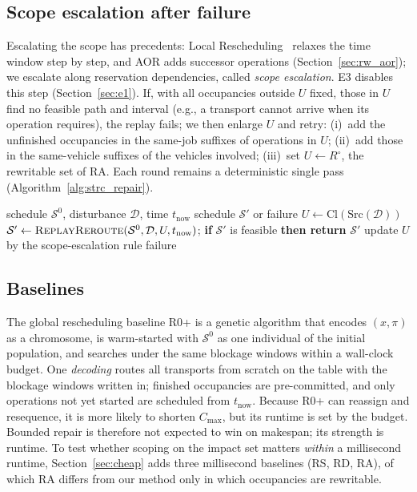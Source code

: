 \documentclass[manuscript,screen,review]{acmart}
\begin{document}
\subsection{Scope escalation after failure}
\label{sec:scope_escalation}

Escalating the scope has precedents: Local Rescheduling~\cite{kuster2007local} relaxes the time window step by step, and AOR adds successor operations (Section~\ref{sec:rw_aor}); we escalate along reservation dependencies, called \emph{scope escalation}. E3 disables this step (Section~\ref{sec:e1}).
If, with all occupancies outside \(U\) fixed, those in \(U\) find no feasible path and interval (e.g., a transport cannot arrive when its operation requires), the replay fails; we then enlarge \(U\) and retry:
(i)~add the unfinished occupancies in the same-job suffixes of operations in \(U\); (ii)~add those in the same-vehicle suffixes of the vehicles involved; (iii)~set \(U\leftarrow R^{\circ}\), the rewritable set of RA.
Each round remains a deterministic single pass (Algorithm~\ref{alg:strc_repair}).

\begin{algorithm}[t]
\caption{Bounded repair on the reservation impact set (single-pass rerouting + scope escalation)}
\label{alg:strc_repair}
\begin{algorithmic}[1]
\Require schedule \(\mathcal{S}^0\), disturbance \(\mathcal{D}\), time \(t_{\mathrm{now}}\)
\Ensure schedule \(\mathcal{S}'\) or failure
\State \(U \gets \mathrm{Cl}(\mathrm{Src}(\mathcal{D}))\)
  \State \(\mathcal{S}' \gets \textsc{ReplayReroute}(\mathcal{S}^0,\mathcal{D},U,t_{\mathrm{now}})\); \textbf{if} \(\mathcal{S}'\) is feasible \textbf{then return} \(\mathcal{S}'\)
  \State update \(U\) by the scope-escalation rule 
\EndFor
\State \Return failure
\end{algorithmic}
\end{algorithm}

\subsection{Baselines}
\label{sec:vs_r0}

The global rescheduling baseline R0+ is a genetic algorithm that encodes \((x,\pi)\) as a chromosome, is warm-started with \(\mathcal{S}^0\) as one individual of the initial population, and searches under the same blockage windows within a wall-clock budget.
One \emph{decoding} routes all transports from scratch on the table with the blockage windows written in; finished occupancies are pre-committed, and only operations not yet started are scheduled from \(t_{\mathrm{now}}\).
Because R0+ can reassign and resequence, it is more likely to shorten \(C_{\max}\), but its runtime is set by the budget.
Bounded repair is therefore not expected to win on makespan; its strength is runtime. To test whether scoping on the impact set matters \emph{within} a millisecond runtime,
Section~\ref{sec:cheap} adds three millisecond baselines (RS, RD, RA), of which RA differs from our method only in which occupancies are rewritable.
\end{document}
